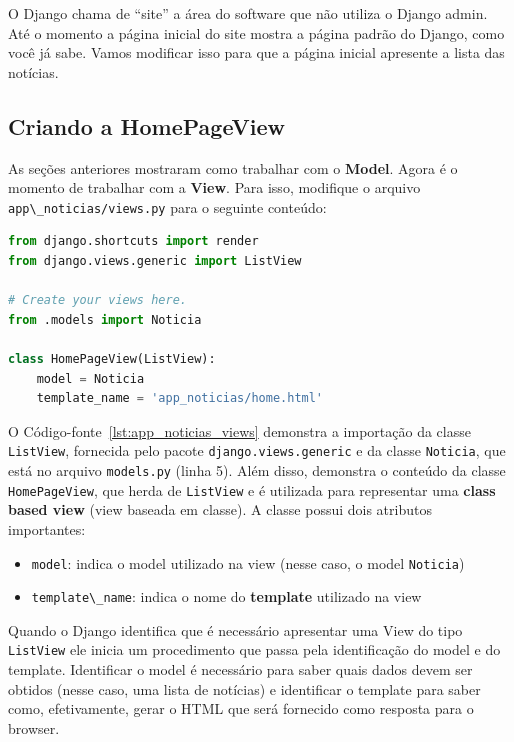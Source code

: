 \documentclass[brazil,a4paper,oneside,openright,parskip=full]{book}
\newcommand{\passthrough}[1]{#1}
\providecommand{\tightlist}{%
  \setlength{\itemsep}{0pt}\setlength{\parskip}{0pt}}
\begin{document}
O Django chama de ``site'' a área do software que não utiliza o Django
admin. Até o momento a página inicial do site mostra a página padrão do
Django, como você já sabe. Vamos modificar isso para que a página
inicial apresente a lista das notícias.

\hypertarget{criando-a-homepageview}{%
\subsection{Criando a HomePageView}\label{criando-a-homepageview}}

As seções anteriores mostraram como trabalhar com o \textbf{Model}.
Agora é o momento de trabalhar com a \textbf{View}. Para isso, modifique
o arquivo \passthrough{\lstinline!app\_noticias/views.py!} para o
seguinte conteúdo:

\begin{lstlisting}[language=Python, caption={Código inicial para as views do software Notícias}, label=lst:app_noticias_views]
from django.shortcuts import render
from django.views.generic import ListView

# Create your views here.
from .models import Noticia

class HomePageView(ListView):
    model = Noticia
    template_name = 'app_noticias/home.html'
\end{lstlisting}

O Código-fonte~\ref{lst:app_noticias_views} demonstra a importação da
classe \passthrough{\lstinline!ListView!}, fornecida pelo pacote
\passthrough{\lstinline!django.views.generic!} e da classe
\passthrough{\lstinline!Noticia!}, que está no arquivo
\passthrough{\lstinline!models.py!} (linha 5). Além disso, demonstra o
conteúdo da classe \passthrough{\lstinline!HomePageView!}, que herda de
\passthrough{\lstinline!ListView!} e é utilizada para representar uma
\textbf{class based view} (view baseada em classe). A classe possui dois
atributos importantes:

\begin{itemize}
\tightlist
\item
  \passthrough{\lstinline!model!}: indica o model utilizado na view
  (nesse caso, o model \passthrough{\lstinline!Noticia!})
\item
  \passthrough{\lstinline!template\_name!}: indica o nome do
  \textbf{template} utilizado na view
\end{itemize}

Quando o Django identifica que é necessário apresentar uma View do tipo
\passthrough{\lstinline!ListView!} ele inicia um procedimento que passa
pela identificação do model e do template. Identificar o model é
necessário para saber quais dados devem ser obtidos (nesse caso, uma
lista de notícias) e identificar o template para saber como,
efetivamente, gerar o HTML que será fornecido como resposta para o
browser.
\end{document}

